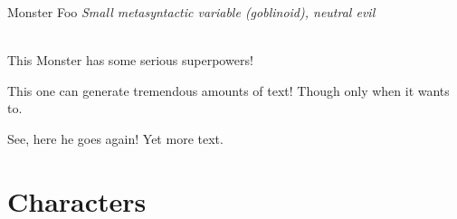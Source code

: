\documentclass[10pt,twoside,twocolumn]{article}
\begin{document}
\begin{monsterbox}{Monster Foo}
	\textit{Small metasyntactic variable (goblinoid), neutral evil}\\
	\hline
	\basics[%
	armorclass = 12,
	hitpoints  = 16 (3d8 + 3),
	speed      = 50 ft
	]
	\hline
	\stats[
    STR = \stat{12}, %
    DEX = \stat{7}
	]
	\hline
	\details[%
	languages = {Common Lisp, Erlang},
	]
	\hline \\[1mm]
	\begin{monsteraction}
		This Monster has some serious superpowers!
	\end{monsteraction}
	\begin{monsteraction}
		This one can generate tremendous amounts of text! Though only when it wants to.
	\end{monsteraction}

	\begin{monsteraction}
    See, here he goes again! Yet more text.
	\end{monsteraction}
\end{monsterbox}

\section{Characters}
\end{document}

